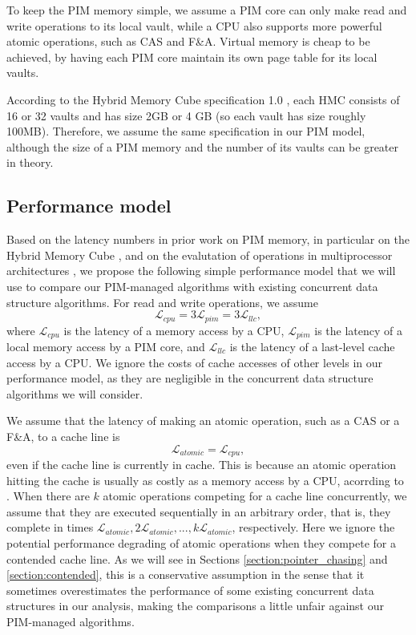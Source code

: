 \documentclass[11pt]{article}
\newcommand{\latpim} {\mathcal{L}_{pim}}
\newcommand{\latcpu} {\mathcal{L}_{cpu}}
\newcommand{\latllc} {\mathcal{L}_{llc}}
\newcommand{\latato} {\mathcal{L}_{atomic}}
\begin{document}
To keep the PIM memory simple, 
we assume a PIM core can only make read and write operations to its local vault,
while a CPU also supports more powerful atomic operations, such as CAS and F\&A.
Virtual memory is cheap to be achieved, by having each PIM core maintain 
its own page table for its local vaults.

According to the Hybrid Memory Cube specification 1.0 \cite{website:HMC}, each HMC consists of 16 or 
32 vaults and has size 2GB or 4 GB (so each vault has size roughly 100MB). 
Therefore, we assume the same specification in our PIM model, although the size of a PIM memory and 
the number of its vaults can be greater in theory. 

\subsection{Performance model}
\label{section:performance_model}
Based on the latency numbers in prior work on PIM memory, in particular on the Hybrid Memory Cube 
\cite{website:HMC, Azarkhish16}, 
and on the evalutation of operations in multiprocessor architectures \cite{David13},
we propose the following simple performance model that we will use to compare
our PIM-managed algorithms with existing concurrent data structure algorithms.
For read and write operations, we assume 
$$\latcpu = 3\latpim = 3\latllc,$$
where $\latcpu$ is the latency of a memory access by a CPU,
$\latpim$ is the latency of a local memory access by a PIM core, and
$\latllc$ is the latency of a last-level cache access by a CPU.
We ignore the costs of cache accesses of other levels in our performance model,
as they are negligible in the concurrent data structure algorithms we will consider.

We assume that the latency of making an atomic operation, such as a CAS or a F\&A,
to a cache line is 
$$\latato = \latcpu,$$ 
even if the cache line is currently in cache.
This is because an atomic operation hitting the cache is usually 
as costly as a memory access by a CPU, acorrding to \cite{David13}.
When there are $k$ atomic operations competing for a cache line concurrently,
we assume that they are executed sequentially in an arbitrary order, that is,
they complete in times $\latato, 2\latato,..., k\latato$, respectively.
Here we ignore the potential performance degrading of atomic operations
when they compete for a contended cache line.
As we will see in Sections \ref{section:pointer_chasing} and
\ref{section:contended}, this is a conservative assumption
in the sense that it sometimes overestimates the performance of some existing
concurrent data structures in our analysis,
making the comparisons a little unfair against our PIM-managed algorithms.
\end{document}
